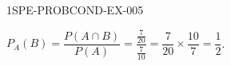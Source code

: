 \begin{corrige}{1SPE-PROBCOND-EX-005}

$P_A(B) = \dfrac{P(A \cap B)}{P(A)} = \dfrac{\frac{7}{20}}{\frac{7}{10}} = \dfrac{7}{20} \times \dfrac{10}{7} = \dfrac{1}{2}$.

\end{corrige}
